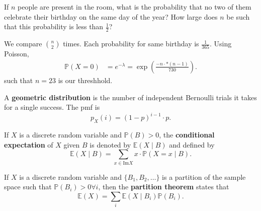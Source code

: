 \begin{eg}
	If \( n \) people are present in  the room, what is the probability that no two of them celebrate their birthday on the same day of the year? How large does \( n \) be such that this probability is less than \( \frac{1}{2} \)?
\end{eg}
\begin{explanation}
	We compare \( \binom{n}{2} \) times. Each probability for same birthday is \( \frac{1}{365} \). Using Poisson,
	\begin{align*}
		\mathbb{P}(X = 0) &= e^{-\lambda } = \exp \left( \frac{-n \cdot * (n-1)}{730} \right)
	.\end{align*}
	such that \( n=23  \) is our threshhold.
\end{explanation}

\begin{definition}
	A \textbf{geometric distribution} is the number of independent Bernoulli trials it takes for a single success. The pmf is \[
		p_X(i) = (1 - p)^{i-1}  \cdot p
	.\] 
\end{definition}

\begin{definition}
	If \( X  \) is a discrete random variable and \( \mathbb{P}(B) > 0 \), the \textbf{conditional expectation} of \( X \) given \( B \) is denoted by \( \mathbb{E}(X \mid B) \) and defined by \[
		\mathbb{E}(X \mid B) = \sum_{x \in \text{Im}X} x\cdot \mathbb{P}(X = x \mid B)
	.\] 
\end{definition}

\begin{definition}
	If \( X \) is a discrete random variable and \( \{B_{1}, B_{2}, \ldots \}  \) is a partition of the sample space such that \( \mathbb{P}(B_i) > 0 \forall i \), then the \textbf{partition theorem} states that 
	\[
		\mathbb{E} (X) = \sum_i \mathbb{E}(X \mid B_i) \mathbb{P}(B_i)
	.\] 
\end{definition}
